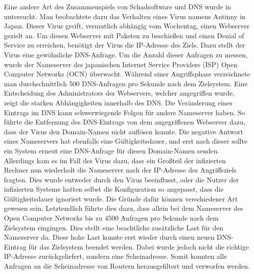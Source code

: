 \documentclass[a4paper, 12pt, BCOR10mm, DIV12, toc=bibliography, toc=listof, german]{scrbook}
\begin{document}
	Eine andere Art des Zusammenspiels von Schadsoftware und DNS wurde in \cite{isetal2005}
	untersucht.  Man beobachtete dazu das Verhalten eines Virus namens \glqq{}Antinny\grqq{} in Japan.
	Dieser Virus greift, vermutlich abhängig vom Wochentag, einen Webserver gezielt an. Um diesen
	Webserver mit Paketen zu beschießen und einen Denial of Service zu erreichen, benötigt der Virus
	die IP-Adresse des Ziels. Dazu stellt der Virus eine gewöhnliche DNS-Anfrage. Um die Anzahl dieser
	Anfragen zu messen, wurde der Nameserver des japanischen Internet Service Providers (ISP) Open
	Computer Networks (OCN) überwacht. Während einer Angriffsphase verzeichnete man durchschnittlich
	500 DNS-Anfragen pro Sekunde nach dem Zielsystem. Eine Entscheidung des Administrators des
	Webservers, welcher angegriffen wurde, zeigt die starken Abhängigkeiten innerhalb des DNS. Die
	Veränderung eines Eintrags im DNS kann schwerwiegende Folgen für andere Nameserver haben. So
	führte die Entfernung des DNS-Eintrags von dem angegriffenen Webserver dazu, dass der Virus den
	Domain-Namen nicht auflösen konnte. Die negative Antwort eines Nameservers hat ebenfalls eine
	Gültigkeitsdauer, und erst nach dieser sollte ein System erneut eine DNS-Anfrage für diesen
	Domain-Namen senden.  Allerdings kam es im Fall des Virus dazu, dass ein Großteil der infizierten
	Rechner nun wiederholt die Nameserver nach der IP-Adresse des Angriffsziels fragten. Dies wurde
	entweder durch den Virus beeinflusst, oder die Nutzer der infizierten Systeme hatten
	selbst die Konfiguration so angepasst, dass die Gültigkeitsdauer ignoriert wurde. Die Gründe dafür
	können verschiedener Art gewesen sein. Letztendlich führte dies dazu, dass allein bei dem
	Nameserver des Open Computer Networks bis zu 4500 Anfragen pro Sekunde nach dem Zielsystem
	eingingen. Dies stellt eine beachtliche zusätzliche Last für den Nameserver da. Diese hohe Last
	konnte erst wieder durch einen neuen DNS-Eintrag für das Zielsystem beendet werden. Dabei wurde
	jedoch nicht die richtige IP-Adresse zurückgeliefert, sondern eine Scheinadresse. Somit konnten
	alle Anfragen an die Scheinadresse von Routern herausgefiltert und verworfen werden.
\end{document}
